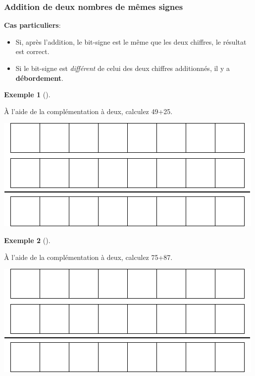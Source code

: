 \documentclass[
  letterpaper,
]{scrbook}
\providecommand{\tightlist}{%
  \setlength{\itemsep}{0pt}\setlength{\parskip}{0pt}}\usepackage{longtable,booktabs,array}
\theoremstyle{plain}
\theoremstyle{definition}
\newtheorem{example}{Exemple}[chapter]
\theoremstyle{definition}
\theoremstyle{remark}
\begin{document}
\hypertarget{addition-de-deux-nombres-de-muxeames-signes}{%
\subsubsection*{Addition de deux nombres de mêmes
signes}\label{addition-de-deux-nombres-de-muxeames-signes}}

\textbf{Cas particuliers}:

\begin{itemize}
\tightlist
\item
  Si, après l'addition, le bit-signe est le même que les deux chiffres,
  le résultat est correct.
\item
  Si le bit-signe est \emph{différent} de celui des deux chiffres
  additionnés, il y a \textbf{débordement}.
\end{itemize}

\leavevmode{}%
\begin{example}[]\label{exm-addition-complement-deux-1}

À l'aide de la complémentation à deux, calculez 49+25.

\includegraphics{./systeme_numeration_files/figure-pdf/unnamed-chunk-8-1.pdf}

\end{example}

\leavevmode{}%
\begin{example}[]\label{exm-addition-complement-deux-2}

À l'aide de la complémentation à deux, calculez 75+87.

\includegraphics{./systeme_numeration_files/figure-pdf/unnamed-chunk-9-1.pdf}

\end{example}
\end{document}
